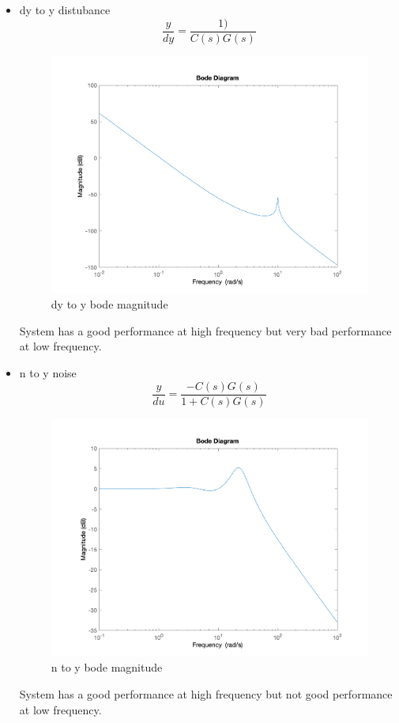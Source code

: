 \begin{itemize}
    \item dy to y distubance
    $$
    \dfrac{y}{dy} = \dfrac{1)}{C(s)G(s)}
    $$
    \begin{figure}[H]
        \caption{dy to y bode magnitude}
        \centering
        \includegraphics[width=12cm]{../Figure/Q1/Q1_c/bode_dy2y.png}
    \end{figure}
    System has a good performance at high frequency but very bad performance at low frequency.
    \item n to y noise
    $$
    \dfrac{y}{du} = \dfrac{-C(s)G(s)}{1+C(s)G(s)}
    $$
    \begin{figure}[H]
        \caption{n to y bode magnitude}
        \centering
        \includegraphics[width=12cm]{../Figure/Q1/Q1_c/bode_n2y.png}
    \end{figure}
    System has a good performance at high frequency but not good performance at low frequency.
\end{itemize}
